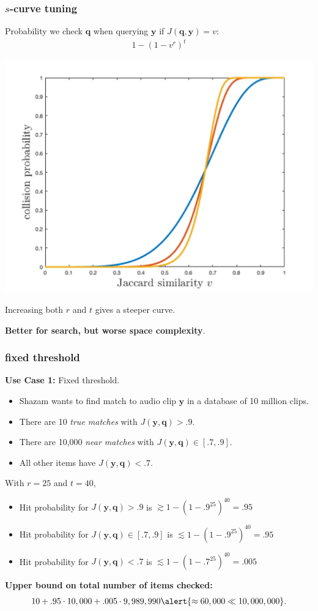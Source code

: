 \documentclass[compress]{beamer}
\newcommand{\bv}[1]{\mathbf{#1}}
\begin{document}
\begin{frame}
	\frametitle{$s$-curve tuning}
	Probability we check $\bv{q}$ when querying $\bv{y}$ if $J(\bv{q},\bv{y}) = v$:
	\begin{align*}
	1 - (1 - v^r)^t
	\end{align*}
	\begin{center}
		\includegraphics[width=.6\textwidth]{scurve_centered.png}
		
		Increasing both $r$ and $t$ gives a steeper curve. 
		
		\alert{\textbf{Better for search, but worse space complexity}.}
	\end{center}
\end{frame}

\begin{frame}
	\frametitle{fixed threshold}
	\small
	\textbf{Use Case 1:} Fixed threshold.
	\begin{itemize}
		\item Shazam wants to find match to audio clip $\bv{y}$ in a database of 10 million  clips.
		\item There are 10 \emph{true matches} with $J(\bv{y},\bv{q}) > .9$.
		\item There are 10,000 \emph{near matches} with $J(\bv{y},\bv{q}) \in [.7,.9]$.
		\item All other items have $J(\bv{y},\bv{q}) < .7$.
	\end{itemize}
	With $r = 25$ and $t = 40$, 
	\begin{itemize}
		\item Hit probability for $J(\bv{y},\bv{q}) > .9$ is $\gtrsim 1 - (1 - .9^{25})^{40} = .95$
		\item Hit probability for $J(\bv{y},\bv{q}) \in [.7,.9]$ is $\lesssim 1 - (1 - .9^{25})^{40} = .95$
		\item Hit probability for $J(\bv{y},\bv{q}) < .7$ is $\lesssim 1 - (1 - .7^{25})^{40} = .005$
	\end{itemize}
	\textbf{Upper bound on total number of items checked:} 
	\begin{align*}
	10 + .95 \cdot 10,000 + .005 \cdot 9,989,990 \alert{\approx 60,000 \ll 10,000,000}.
	\end{align*}  
\end{frame}
\end{document}
